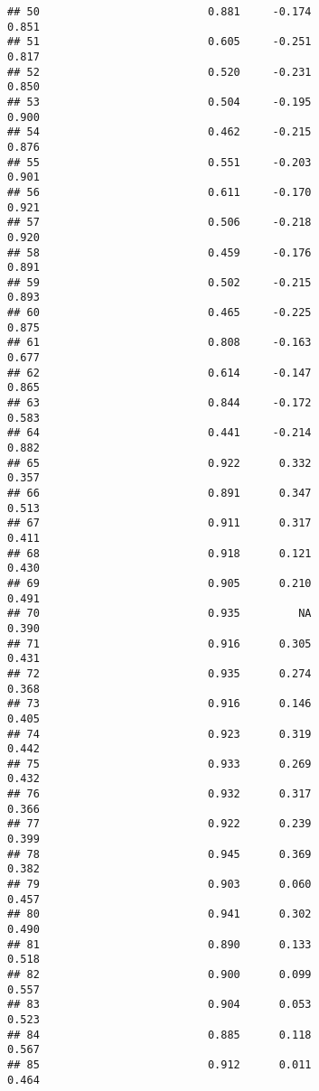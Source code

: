\documentclass[
]{article}
\begin{document}
\begin{verbatim}
## 50                          0.881     -0.174                     0.851
## 51                          0.605     -0.251                     0.817
## 52                          0.520     -0.231                     0.850
## 53                          0.504     -0.195                     0.900
## 54                          0.462     -0.215                     0.876
## 55                          0.551     -0.203                     0.901
## 56                          0.611     -0.170                     0.921
## 57                          0.506     -0.218                     0.920
## 58                          0.459     -0.176                     0.891
## 59                          0.502     -0.215                     0.893
## 60                          0.465     -0.225                     0.875
## 61                          0.808     -0.163                     0.677
## 62                          0.614     -0.147                     0.865
## 63                          0.844     -0.172                     0.583
## 64                          0.441     -0.214                     0.882
## 65                          0.922      0.332                     0.357
## 66                          0.891      0.347                     0.513
## 67                          0.911      0.317                     0.411
## 68                          0.918      0.121                     0.430
## 69                          0.905      0.210                     0.491
## 70                          0.935         NA                     0.390
## 71                          0.916      0.305                     0.431
## 72                          0.935      0.274                     0.368
## 73                          0.916      0.146                     0.405
## 74                          0.923      0.319                     0.442
## 75                          0.933      0.269                     0.432
## 76                          0.932      0.317                     0.366
## 77                          0.922      0.239                     0.399
## 78                          0.945      0.369                     0.382
## 79                          0.903      0.060                     0.457
## 80                          0.941      0.302                     0.490
## 81                          0.890      0.133                     0.518
## 82                          0.900      0.099                     0.557
## 83                          0.904      0.053                     0.523
## 84                          0.885      0.118                     0.567
## 85                          0.912      0.011                     0.464

\end{verbatim}
\end{document}
